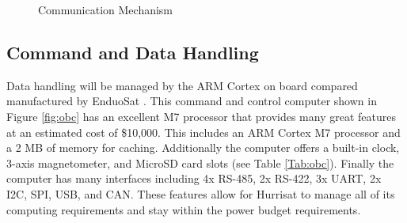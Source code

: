 \begin{figure}[hbt!]
    \centering
    \label{fig:c1}
    \qquad
    \label{fig:c2}
    \caption{Communication Mechanism}
    \label{fig:comms}
\end{figure}

\subsection{Command and Data Handling}
Data handling will be managed by the ARM Cortex on board compared manufactured by EnduoSat \cite{Endurosat}. This command and control computer shown in Figure \ref{fig:obc} has an excellent M7 processor that provides many great features at an estimated cost of \$10,000. This includes an ARM Cortex M7 processor and a 2 MB of memory for caching. Additionally the computer offers a built-in clock, 3-axis magnetometer, and MicroSD card slots (see Table \ref{Tab:obc}). Finally the computer has many interfaces including 4x RS-485, 2x RS-422, 3x UART, 2x I2C, SPI, USB, and CAN. These features allow for Hurrisat to manage all of its computing requirements and stay within the power budget requirements.

